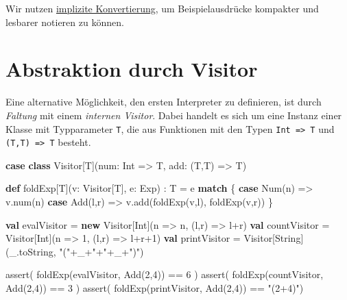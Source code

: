 \documentclass[]{article}
\newenvironment{Shaded}{}{}
\newcommand{\DecValTok}[1]{\textcolor[rgb]{0.25,0.63,0.44}{#1}}
\newcommand{\FunctionTok}[1]{\textcolor[rgb]{0.02,0.16,0.49}{#1}}
\newcommand{\KeywordTok}[1]{\textcolor[rgb]{0.00,0.44,0.13}{\textbf{#1}}}
\newcommand{\NormalTok}[1]{#1}
\newcommand{\StringTok}[1]{\textcolor[rgb]{0.25,0.44,0.63}{#1}}
\begin{document}
Wir nutzen \hyperlink{implizite-konvertierung}{implizite
Konvertierung}, um Beispielausdrücke kompakter und lesbarer notieren zu
können.

\hypertarget{abstraktion-durch-visitor}{%
\section{Abstraktion durch Visitor}\label{abstraktion-durch-visitor}}

Eine alternative Möglichkeit, den ersten Interpreter zu definieren, ist
durch \emph{Faltung} mit einem \emph{internen Visitor}. Dabei handelt es
sich um eine Instanz einer Klasse mit Typparameter \texttt{T}, die aus
Funktionen mit den Typen \texttt{Int\ =\textgreater{}\ T} und
\texttt{(T,T)\ =\textgreater{}\ T} besteht.

\begin{Shaded}
\begin{Highlighting}[]
\KeywordTok{case} \KeywordTok{class}\NormalTok{ Visitor[T](num: Int =\textgreater{} T, add: (T,T) =\textgreater{} T)}

\KeywordTok{def}\NormalTok{ foldExp[T](v: Visitor[T], e: Exp) : T = e }\KeywordTok{match}\NormalTok{ \{}
  \KeywordTok{case} \FunctionTok{Num}\NormalTok{(n) =\textgreater{} v.}\FunctionTok{num}\NormalTok{(n)}
  \KeywordTok{case} \FunctionTok{Add}\NormalTok{(l,r) =\textgreater{} v.}\FunctionTok{add}\NormalTok{(}\FunctionTok{foldExp}\NormalTok{(v,l), }\FunctionTok{foldExp}\NormalTok{(v,r))}
\NormalTok{\}}

\KeywordTok{val}\NormalTok{ evalVisitor = }\KeywordTok{new}\NormalTok{ Visitor[Int](n =\textgreater{} n, (l,r) =\textgreater{} l+r)}
\KeywordTok{val}\NormalTok{ countVisitor = Visitor[Int](n =\textgreater{} }\DecValTok{1}\NormalTok{, (l,r) =\textgreater{} l+r+}\DecValTok{1}\NormalTok{)}
\KeywordTok{val}\NormalTok{ printVisitor = Visitor[String](\_.}\FunctionTok{toString}\NormalTok{, }\StringTok{"("}\NormalTok{+\_+}\StringTok{"+"}\NormalTok{+\_+}\StringTok{")"}\NormalTok{)}

\FunctionTok{assert}\NormalTok{( }\FunctionTok{foldExp}\NormalTok{(evalVisitor, }\FunctionTok{Add}\NormalTok{(}\DecValTok{2}\NormalTok{,}\DecValTok{4}\NormalTok{)) == }\DecValTok{6}\NormalTok{ )}
\FunctionTok{assert}\NormalTok{( }\FunctionTok{foldExp}\NormalTok{(countVisitor, }\FunctionTok{Add}\NormalTok{(}\DecValTok{2}\NormalTok{,}\DecValTok{4}\NormalTok{)) == }\DecValTok{3}\NormalTok{ )}
\FunctionTok{assert}\NormalTok{( }\FunctionTok{foldExp}\NormalTok{(printVisitor, }\FunctionTok{Add}\NormalTok{(}\DecValTok{2}\NormalTok{,}\DecValTok{4}\NormalTok{)) == }\StringTok{"(2+4)"}\NormalTok{)}
\end{Highlighting}
\end{Shaded}
\end{document}
